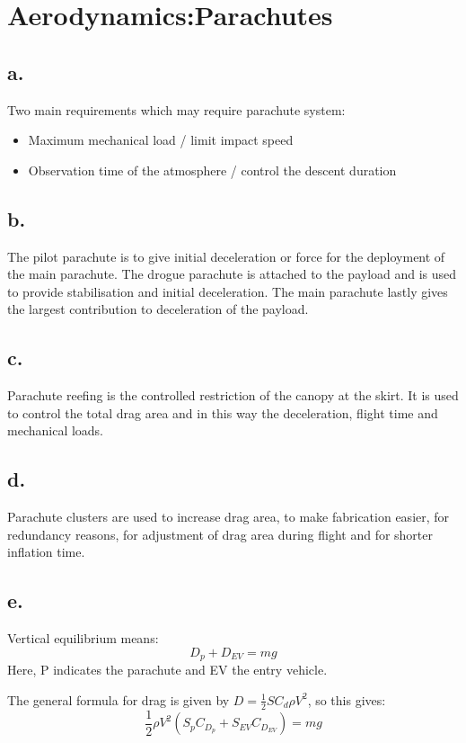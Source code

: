 \section{ Aerodynamics:Parachutes }\label{sec:q3} 
\subsection*{a.}
Two main requirements which may require parachute system:
\begin{itemize}
    \item Maximum mechanical load / limit impact speed
    \item Observation time of the atmosphere / control the descent duration
\end{itemize}

\subsection*{b.}
The pilot parachute is to give initial deceleration or force for the deployment of the main parachute. The drogue parachute is attached to the payload and is used to provide stabilisation and initial deceleration. The main parachute lastly gives the largest contribution to deceleration of the payload.

\subsection*{c.}
Parachute reefing is the controlled restriction of the canopy at the skirt. It is used to control the total drag area and in this way the deceleration, flight time and mechanical loads.

\subsection*{d.}
Parachute clusters are used to increase drag area, to make fabrication easier, for redundancy reasons, for adjustment of drag area during flight and for shorter inflation time.

\subsection*{e.}
Vertical equilibrium means:
\begin{equation}
    D_p + D_{EV} = mg
\end{equation}
Here, P indicates the parachute and EV the entry vehicle.

The general formula for drag is given by $D = \frac{1}{2} S C_d \rho V^2$, so this gives:
\begin{equation}
    \frac{1}{2}\rho V^2 (S_{p}C_{D_p} + S_{EV}C_{D_{EV}}) = mg
\end{equation}

